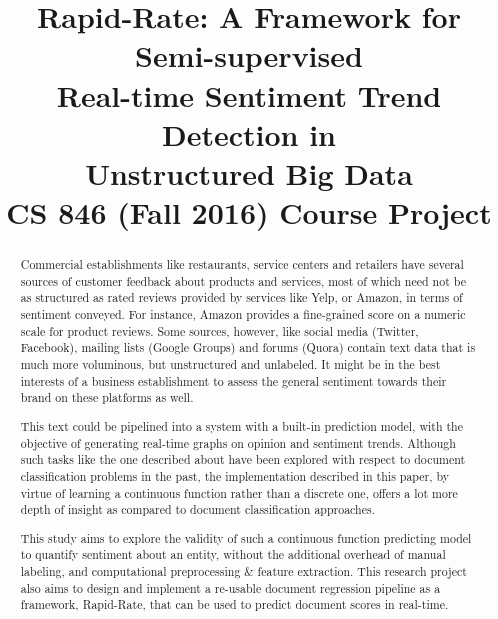 \documentclass[conference]{IEEEtran}
\begin{document}
\title{
    Rapid-Rate: A Framework for Semi-supervised\\Real-time Sentiment Trend Detection in\\Unstructured Big Data\\
    \vspace{5mm}
    \large CS 846 (Fall 2016) Course Project
}

\author{
}

\maketitle

\begin{abstract}
    Commercial establishments like restaurants, service centers and retailers have several sources of customer feedback about products and services, most of which need not be as structured as rated reviews provided by services like Yelp, or Amazon, in terms of sentiment conveyed.
    For instance, Amazon provides a fine-grained score on a numeric scale for product reviews.
    Some sources, however, like social media (Twitter, Facebook), mailing lists (Google Groups) and forums (Quora) contain text data that is much more voluminous, but unstructured and unlabeled.
    It might be in the best interests of a business establishment to assess the general sentiment towards their brand on these platforms as well. 
    
    This text could be pipelined into a system with a built-in prediction model, with the objective of generating real-time graphs on opinion and sentiment trends.
    Although such tasks like the one described about have been explored with respect to document classification problems in the past, the implementation described in this paper, by virtue of learning a continuous function rather than a discrete one, offers a lot more depth of insight as compared to document classification approaches. 
    
    This study aims to explore the validity of such a continuous function predicting model to quantify sentiment about an entity, without the additional overhead of manual labeling, and computational preprocessing \& feature extraction.
    This research project also aims to design and implement a re-usable document regression pipeline as a framework, Rapid-Rate\cite{rapid_rate}, that can be used to predict document scores in real-time.
\end{abstract}
\end{document}
